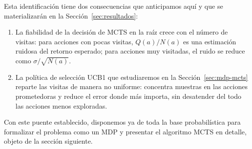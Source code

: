 Esta identificación tiene dos consecuencias que anticipamos aquí y que se materializarán en la Sección~\ref{sec:resultados}:

\begin{enumerate}
    \item La fiabilidad de la decisión de MCTS en la raíz crece con el número de visitas: para acciones con pocas visitas, $Q(a)/N(a)$ es una estimación ruidosa del retorno esperado; para acciones muy visitadas, el ruido se reduce como $\sigma/\sqrt{N(a)}$.
    \item La política de selección UCB1 que estudiaremos en la Sección~\ref{sec:mdp-mcts} reparte las visitas de manera no uniforme: concentra muestras en las acciones prometedoras y reduce el error donde más importa, sin desatender del todo las acciones menos exploradas.
\end{enumerate}

Con este puente establecido, disponemos ya de toda la base probabilística para formalizar el problema como un MDP y presentar el algoritmo MCTS en detalle, objeto de la sección siguiente.
